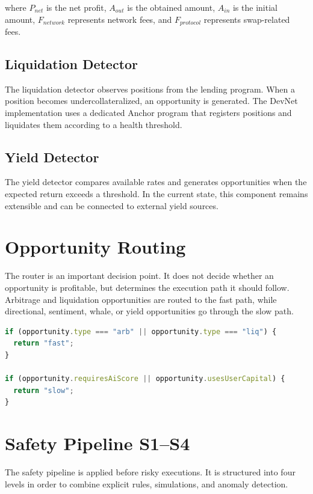 \documentclass[12pt,a4paper]{report}
\begin{document}
where $P_{net}$ is the net profit, $A_{out}$ is the obtained amount, $A_{in}$ is the initial amount, $F_{network}$ represents network fees, and $F_{protocol}$ represents swap-related fees.

\subsection{Liquidation Detector}

The liquidation detector observes positions from the lending program. When a position becomes undercollateralized, an opportunity is generated. The DevNet implementation uses a dedicated Anchor program that registers positions and liquidates them according to a health threshold.

\subsection{Yield Detector}

The yield detector compares available rates and generates opportunities when the expected return exceeds a threshold. In the current state, this component remains extensible and can be connected to external yield sources.

\section{Opportunity Routing}

The router is an important decision point. It does not decide whether an opportunity is profitable, but determines the execution path it should follow. Arbitrage and liquidation opportunities are routed to the fast path, while directional, sentiment, whale, or yield opportunities go through the slow path.

\begin{lstlisting}[language=JavaScript, caption={Simplified routing principle}]
if (opportunity.type === "arb" || opportunity.type === "liq") {
  return "fast";
}

if (opportunity.requiresAiScore || opportunity.usesUserCapital) {
  return "slow";
}
\end{lstlisting}

\section{Safety Pipeline S1--S4}

The safety pipeline is applied before risky executions. It is structured into four levels in order to combine explicit rules, simulations, and anomaly detection.
\end{document}
